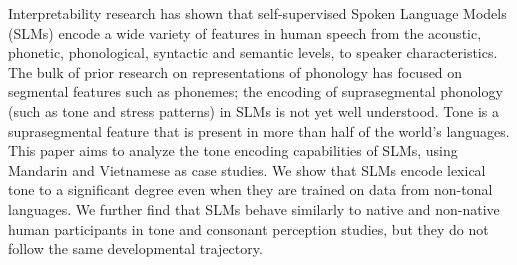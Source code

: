 Interpretability research has shown that self-supervised Spoken Language Models (SLMs) encode a wide variety of features in human speech from the acoustic, phonetic, phonological, syntactic and semantic levels, to speaker characteristics. The bulk of prior research on representations of phonology has focused on segmental features such as phonemes; the encoding of suprasegmental phonology (such as tone and stress patterns) in SLMs is not yet well understood. Tone is a suprasegmental feature that is present in more than half of the world's languages. This paper aims to analyze the tone encoding capabilities of SLMs, using Mandarin and Vietnamese as case studies. We show that SLMs encode lexical tone to a significant degree even when they are trained on data from non-tonal languages. We further find that SLMs behave similarly to native and non-native human participants in tone and consonant perception studies, but they do not follow the same developmental trajectory.